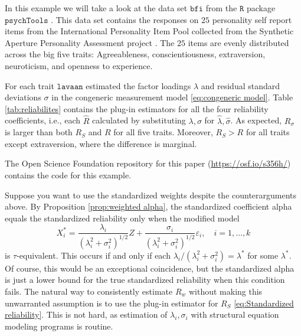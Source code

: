 \documentclass[twoside]{article}
\renewcommand{\sqrt}[1]{{(#1)^{1/2}}}
\begin{document}
\begin{example}
\label{exa:reliabilities}


In this example we will take a look at the data set $\texttt{bfi}$ from the $\texttt{R}$ \citep{Team2013-tt} package $\texttt{psychTools}$ \citep{Revelle2019-te}. This data set contains the responses on $25$ personality self report items from the International Personality Item Pool \citep{Goldberg1999-iz} collected from the Synthetic Aperture Personality Assessment project \citep{Revelle2017-ez}. The $25$ items are evenly distributed across the big five traits: Agreeableness, conscientiousness, extraversion, neuroticism, and openness to experience. 

For each trait $\texttt{lavaan}$ \citep{Rosseel2012-yg} estimated the factor loadings $\lambda$ and residual standard deviations $\sigma$ in the congeneric measurement model \eqref{eq:congeneric model}. Table \ref{tab:reliabilites} contains the plug-in estimators for all the four reliability coefficients, i.e., each $\hat{ R}$ calculated by substituting $\lambda,\sigma$ for $\hat{\lambda},\hat{\sigma}$. As expected, $ R_\sigma$ is larger than both $ R_S$ and $ R$ for all five traits. Moreover, $ R_S >  R$ for all traits except extraversion, where the difference is marginal. 

The Open Science Foundation repository for this paper (\url{https://osf.io/s356h/}) contains the code for this example.
\end{example} 

Suppose you want to use the standardized weights despite the counterarguments above. By Proposition \ref{prop:weighted alpha}, the standardized coefficient alpha equals the standardized reliability only when the modified model
\begin{equation}\label{eq:std-modified model}
X_{i}^{*}=\frac{\lambda_{i}}{\sqrt{\lambda_{i}^{2}+\sigma_{i}^{2}}}Z+\frac{\sigma_{i}}{\sqrt{\lambda_{i}^{2}+\sigma_{i}^{2}}}\varepsilon_{i}, \quad i=1,\ldots,k    \end{equation}
is $\tau$-equivalent. This occurs if and only if each $\lambda_{i}/(\lambda_{i}^{2}+\sigma_{i}^{2})=\lambda^{*}$
for some $\lambda^{*}$. Of course, this would be an exceptional coincidence, but the standardized alpha is just a lower bound for the true standardized reliability when this condition fails. The natural way to consistently estimate $ R_w$ without making this unwarranted assumption is to use the plug-in estimator for $ R_S$ \eqref{eq:Standardized reliability}. This is not hard, as estimation of $\lambda_{i},\sigma_{i}$ with structural equation modeling programs is routine. 
\end{document}
